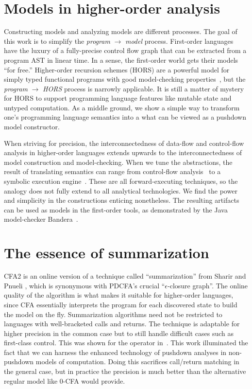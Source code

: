 \section{Models in higher-order analysis}

Constructing models and analyzing models are different processes.
%
The goal of this work is to simplify the \textit{program} $\to$ \textit{model} process.
%
First-order languages have the luxury of a fully-precise control flow graph that can be extracted from a program AST in linear time.
%
In a sense, the first-order world gets their models ``for free.''
%
Higher-order recursion schemes (HORS) are a powerful model for simply typed functional programs with good model-checking properties~\citep{dvanhorn:Ong2006ModelChecking}, but the \textit{program} $\to$ \textit{HORS} process is narrowly applicable.
%
It is still a matter of mystery for HORS to support programming language features like mutable state and untyped computation.
As a middle ground, we show a simple way to transform one's programming language semantics into a what can be viewed as a pushdown model constructor.

When striving for precision, the interconnectedness of data-flow and control-flow analysis in higher-order languages extends upwards to the interconnectedness of model construction and model-checking.
%
When we tune the abstractions, the result of translating semantics can range from control-flow analysis~\citep{dvanhorn:VanHorn2010Abstracting} to a symbolic execution engine~\citep{dvanhorn:TobinHochstadt2012Higherorder}.
%
These are all forward-executing techniques, so the analogy does not fully extend to all analytical technologies.
%
We find the power and simplicity in the constructions enticing nonetheless.
%
The resulting artifacts can be used as models in the first-order tools, as demonstrated by the Java model-checker Bandera~\citep{ianjohnson:bandera}.

\section{The essence of summarization}

CFA2 is an online version of a technique called ``summarization'' from Sharir and Pnueli \citep[Chapter 7]{local:muchnick:jones:flow-analysis:1981}, which is synonymous with PDCFA's crucial ``$\epsilon$-closure graph''.
%
The online quality of the algorithm is what makes it suitable for higher-order languages, since CFA essentially interprets the program for each discovered state to build the model on the fly.
%
Summarization algorithms need not be restricted to languages with well-bracketed calls and returns.
%
The technique is adaptable for higher precision in the common case but to still handle difficult cases such as first-class control.
%
This was shown for the  operator in~\citet{ianjohnson:Vardoulakis2011Pushdown}.
%
This work illuminated the fact that we can harness the enhanced technology of pushdown analyses in non-pushdown models of computation.
%
Doing this sacrifices call/return matching in the general case, but in practice the precision is much better than the alternative regular model like 0-CFA would provide.

